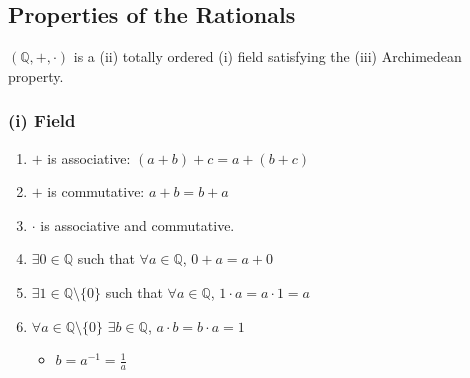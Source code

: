 \documentclass[11pt]{article}
\newcommand{\0}{\emptyset}
\newcommand{\Q}{\mathbb{Q}}
\begin{document}
\subsection*{Properties of the Rationals}
\label{sec:orga348840}
\((\Q,+,\cdot)\) is a (ii) totally ordered (i) field satisfying the (iii) Archimedean property.\\[0pt]
\subsubsection*{(i) Field}
\label{sec:org3ea3a0e}
\begin{enumerate}
\item \(+\) is associative: \((a+b)+c=a+(b+c)\)\\[0pt]
\item \(+\) is commutative: \(a+b=b+a\)\\[0pt]
\item \(\cdot\) is associative and commutative.\\[0pt]
\item \(\exists 0\in\Q\) such that \(\forall a\in\Q\), \(0+a=a+0\)\\[0pt]
\item \(\exists 1\in\Q\setminus\{0\}\) such that \(\forall a\in\Q\), \(1\cdot a=a\cdot 1=a\)\\[0pt]
\item \(\forall a\in\Q\setminus\{0\}\) \(\exists b\in\Q\), \(a\cdot b=b\cdot a=1\)\\[0pt]
\begin{itemize}
\item \(b=a^{-1}=\frac{1}{a}\)\\[0pt]
\end{itemize}
\end{enumerate}
\end{document}
